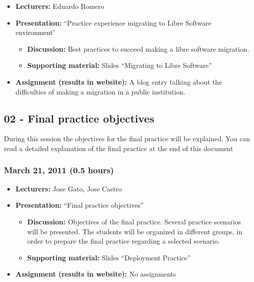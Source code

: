\documentclass[a4paper]{article}
\begin{document}
\begin{itemize}
\item \textbf{Lecturers:} Eduardo Romero
\item \textbf{Presentation:} ``Practice experience migrating to Libre Software environment'
  \begin{itemize}
  \item \textbf{Discussion:} Best practices to succeed making a libre software migration. 
  \item \textbf{Supporting material:} Slides ``Migrating to Libre Software''
  \end{itemize}
\item \textbf{Assignment (results in website):} A blog entry talking about the difficulties of making a migration in a public institution. 
\end{itemize}

\subsection{02 - Final practice objectives}

During this session the objectives for the final practice will be explained. You can read a detailed explanation of the final practice at the end of this document

\subsubsection{March 21, 2011 (0.5 hours)}

\begin{itemize}
\item \textbf{Lecturers:} Jose Gato, Jose Castro
\item \textbf{Presentation:} ``Final practice objectives''
  \begin{itemize}
  \item \textbf{Discussion:} Objectives of the final practice. Several practice scenarios will be presented. The students will be organized in different groups, in order to prepare the final practice regarding a selected scenario. 
  \item \textbf{Supporting material:} Slides ``Deployment Practice''
  \end{itemize}
\item \textbf{Assignment (results in website):} No assignments 
\end{itemize}
\end{document}
